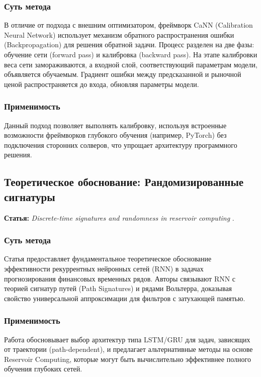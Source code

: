 \documentclass[12pt, a4paper]{article}
\begin{document}
\subsubsection{Суть метода}
В отличие от подхода с внешним оптимизатором, фреймворк CaNN (Calibration Neural Network) использует механизм обратного распространения ошибки (Backpropagation) для решения обратной задачи.
Процесс разделен на две фазы: обучение сети (forward pass) и калибровка (backward pass). На этапе калибровки веса сети замораживаются, а входной слой, соответствующий параметрам модели, объявляется обучаемым. Градиент ошибки между предсказанной и рыночной ценой распространяется до входа, обновляя параметры модели.

\subsubsection{Применимость}
Данный подход позволяет выполнять калибровку, используя встроенные возможности фреймворков глубокого обучения (например, PyTorch) без подключения сторонних солверов, что упрощает архитектуру программного решения.

\subsection{Теоретическое обоснование: Рандомизированные сигнатуры}
\textbf{Статья:} \textit{Discrete-time signatures and randomness in reservoir computing} \cite{Cuchiero2021}.

\subsubsection{Суть метода}
Статья предоставляет фундаментальное теоретическое обоснование эффективности рекуррентных нейронных сетей (RNN) в задачах прогнозирования финансовых временных рядов. Авторы связывают RNN с теорией сигнатур путей (Path Signatures) и рядами Вольтерра, доказывая свойство универсальной аппроксимации для фильтров с затухающей памятью.

\subsubsection{Применимость}
Работа обосновывает выбор архитектур типа LSTM/GRU для задач, зависящих от траектории (path-dependent), и предлагает альтернативные методы на основе Reservoir Computing, которые могут быть вычислительно эффективнее полного обучения глубоких сетей.
\end{document}
